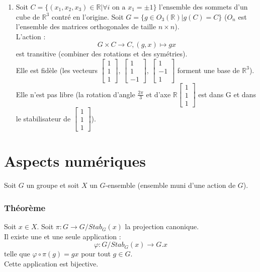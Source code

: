 \documentclass[a4paper, oneside]{report}
\newcommand{\x}{\times}
\newcommand{\R}{\mathbb{R}}
\newcommand{\theo}{\subsubsection{Théorème}}
\begin{document}
\begin{enumerate}
\item Soit $C=\{(x_1,x_2,x_3) \in \R | \forall i\text{ on a } x_1= \pm 1 \}$ l'ensemble des sommets d'un cube de $\R^3$ contré en l'origine. Soit $G = \{g \in O_3(\R) | g(C)=C \}$ ($O_n$ est l'ensemble des matrices orthogonales de taille $n\x n$).\\
L'action :
$$G\x C \rightarrow C, (g,x)\mapsto gx$$
est transitive (combiner des rotations et des symétries).\\
Elle est fidèle (les vecteurs $\left[\begin{array}{l}
1\\
1\\
1
\end{array}\right]$, $\left[\begin{array}{l}
1\\
1\\
-1
\end{array}\right]$, $\left[\begin{array}{l}
1\\
-1\\
1
\end{array}\right]$ forment une base de $\R^3$).\\
Elle n'est pas libre (la rotation d'angle $\frac{2\pi}{3}$ et d'axe $\R \left[\begin{array}{l}
1\\
1\\
1
\end{array}\right]$ est dans G et dans le stabilisateur de $\left[\begin{array}{l}
1\\
1\\
1
\end{array}\right]$).
\end{enumerate}

\section{Aspects numériques}

Soit $G$ un groupe et soit $X$ un $G$-ensemble (ensemble muni d'une action de $G$).

\theo
Soit $x\in X$. Soit $\pi : G \rightarrow G/Stab_G(x)$ la projection canonique.\\
Il existe une et une seule application :
$$\varphi : G/Stab_G(x) \rightarrow G.x$$
telle que $\varphi \circ \pi(g)=gx$ pour tout $g\in G$.\\
Cette application est bijective.
\end{document}
